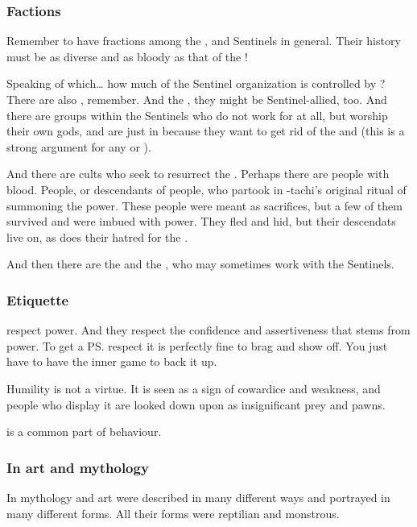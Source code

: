 \subsubsection{Factions}
Remember to have fractions among the \dragons{}, and Sentinels in general. 
Their history must be as diverse and as bloody as that of the \resphain!

Speaking of which\ldots{} how much of the Sentinel organization is controlled by \dragons? There are also \rachyth, remember. And the \Baelzerach, they might be Sentinel-allied, too. And there are groups within the Sentinels who do not work for \dragons{} at all, but worship their own gods, and are just in because they want to get rid of the \banes{} and \resphain{} (this is a strong argument for any \scatha{} or \rachyth). 

And there are cults who seek to resurrect the \xzaishanns. Perhaps there are people with \xzaishannic{} blood. People, or descendants of people, who partook in \Tiamat-tachi's original ritual of summoning the \xzaishannic{} power. These people were meant as sacrifices, but a few of them survived and were imbued with \xzaishannic{} power. They fled and hid, but their descendats live on, as does their hatred for the \draecchonosh. 

And then there are the \ophidians{} and the \nagae{}, who may sometimes work with the Sentinels. 









\subsubsection{Etiquette}
\Dragons{} respect power. 
And they respect the confidence and assertiveness that stems from power. 
To get a \ps{\dragon}{} respect it is perfectly fine to brag and show off. 
You just have to have the inner game to back it up. 

Humility is not a virtue. 
It is seen as a sign of cowardice and weakness, and people who display it are looked down upon as insignificant prey and pawns. 

 is a common part of \Draconic{} behaviour. 





\subsubsection{In art and mythology}
In mythology and art \dragons were described in many different ways and portrayed in many different forms. 
All their forms were reptilian and monstrous. 

